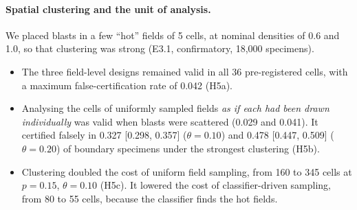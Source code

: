 \documentclass[11pt]{article}
\theoremstyle{remark}
\theoremstyle{definition}
\begin{document}
\paragraph{Spatial clustering and the unit of analysis.} We placed blasts in a few ``hot'' fields of 5 cells, at nominal densities of 0.6 and 1.0, so that clustering was strong (E3.1, confirmatory, 18,000 specimens).
\begin{itemize}
\item The three field-level designs remained valid in all 36 pre-registered cells, with a maximum false-certification rate of 0.042 (H5a).
\item Analysing the cells of uniformly sampled fields \emph{as if each had been drawn individually} was valid when blasts were scattered (0.029 and 0.041). It certified falsely in 0.327 [0.298, 0.357] ($\theta=0.10$) and 0.478 [0.447, 0.509] ($\theta=0.20$) of boundary specimens under the strongest clustering (H5b).
\item Clustering doubled the cost of uniform field sampling, from 160 to 345 cells at $p=0.15$, $\theta=0.10$ (H5c). It lowered the cost of classifier-driven sampling, from 80 to 55 cells, because the classifier finds the hot fields.
\end{itemize}
\end{document}
